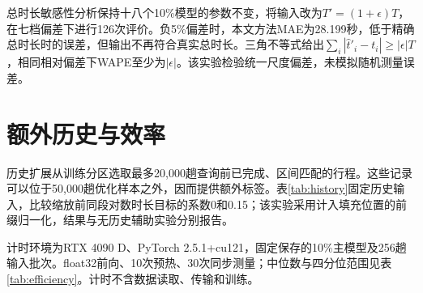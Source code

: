 \documentclass[journal]{IEEEtran}
\begin{document}

总时长敏感性分析保持十八个10\%模型的参数不变，将输入改为$T'=(1+\epsilon)T$，在七档偏差下进行126次评价。负5\%偏差时，本文方法MAE为28.199秒，低于精确总时长时的误差，但输出不再符合真实总时长。三角不等式给出$\sum_i|\hat t'_i-t_i|\geq|\epsilon|T$，相同相对偏差下WAPE至少为$|\epsilon|$。该实验检验统一尺度偏差，未模拟随机测量误差。

\section{额外历史与效率}


历史扩展从训练分区选取最多20,000趟查询前已完成、区间匹配的行程。这些记录可以位于50,000趟优化样本之外，因而提供额外标签。表\ref{tab:history}固定历史输入，比较缩放前同段对数时长目标的系数0和0.15；该实验采用计入填充位置的前缀归一化，结果与无历史辅助实验分别报告。

计时环境为RTX 4090 D、PyTorch 2.5.1+cu121，固定保存的10\%主模型及256趟输入批次。float32前向、10次预热、30次同步测量；中位数与四分位范围见表\ref{tab:efficiency}。计时不含数据读取、传输和训练。



\end{document}
